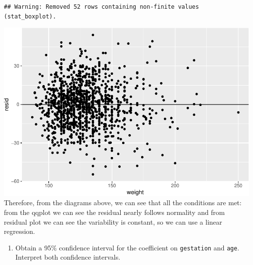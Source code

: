 \documentclass[]{article}
\newenvironment{Shaded}{\begin{snugshade}}{\end{snugshade}}
\newcommand{\DataTypeTok}[1]{\textcolor[rgb]{0.13,0.29,0.53}{#1}}
\newcommand{\KeywordTok}[1]{\textcolor[rgb]{0.13,0.29,0.53}{\textbf{#1}}}
\newcommand{\NormalTok}[1]{#1}
\newcommand{\OperatorTok}[1]{\textcolor[rgb]{0.81,0.36,0.00}{\textbf{#1}}}
\newcommand{\StringTok}[1]{\textcolor[rgb]{0.31,0.60,0.02}{#1}}
\providecommand{\tightlist}{%
  \setlength{\itemsep}{0pt}\setlength{\parskip}{0pt}}
\begin{document}
\begin{Shaded}
\end{Shaded}

\begin{verbatim}
## Warning: Removed 52 rows containing non-finite values (stat_boxplot).
\end{verbatim}

\includegraphics{lab-8-regression_files/figure-latex/unnamed-chunk-22-1.pdf}
Therefore, from the diagrams above, we can see that all the conditions
are met: from the qqplot we can see the residual nearly follows
normality and from residual plot we can see the variability is constant,
so we can use a linear regression.

\newpage

\begin{enumerate}
\def\labelenumi{\arabic{enumi}.}
\setcounter{enumi}{7}
\tightlist
\item
  Obtain a 95\% confidence interval for the coefficient on
  \texttt{gestation} and \texttt{age}. Interpret both confidence
  intervals.
\end{enumerate}

\begin{Shaded}
\end{Shaded}
\end{document}
